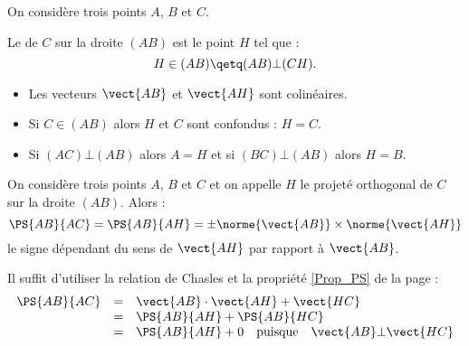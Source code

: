 \documentclass[10pt,openright,twoside,french]{book}
\begin{document}
\begin{Defi}
    On considère trois points $A$, $B$ et $C$.\par
    Le  de $C$ sur la droite $(AB)$ est le point $H$ tel que :
    \[H \in (AB) \qetq (AB) \bot (CH).\]
    \begin{center}
        \qquad
    \end{center}
\end{Defi}

\begin{Rmq}[s]
    \begin{itemize}
        \item Les vecteurs $\vect{AB}$ et $\vect{AH}$ sont colinéaires.
        \item Si $C \in (AB)$ alors $H$ et $C$ sont confondus : $H = C$.
        \item Si $(AC) \bot (AB)$ alors $A = H$ et si $(BC) \bot (AB)$ alors $H = B$.
    \end{itemize}
\end{Rmq}

\begin{Prop}
    On considère trois points $A$, $B$ et $C$ et on appelle $H$ le projeté orthogonal de $C$ sur la droite $(AB)$. Alors :
    \[\PS{AB}{AC} = \PS{AB}{AH} = \pm\norme{\vect{AB}} \times \norme{\vect{AH}}\] le signe dépendant du sens de $\vect{AH}$ par rapport à $\vect{AB}$.
\end{Prop}

\begin{Demo}
    Il suffit d'utiliser la relation de Chasles et la propriété \ref{Prop_PS} de la page \pageref{Prop_PS} :
    \[\begin{array}{rcl}
        \PS{AB}{AC} & = & \vect{AB} \cdot \vect{AH} + \vect{HC} \\
                              & = & \PS{AB}{AH} + \PS{AB}{HC} \\
                              & = & \PS{AB}{AH} + 0 \quad \text{puisque}\quad \vect{AB} \bot \vect{HC}
    \end{array}\]
\end{Demo}
\end{document}
